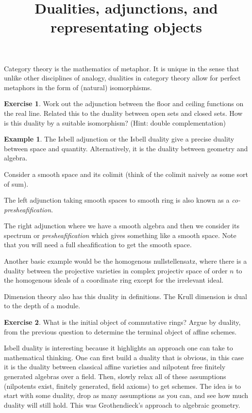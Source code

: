 \documentclass[10pt]{article}
\theoremstyle{plain}%
\theoremstyle{definition}
\newtheorem{example}{Example}[section]
\newtheorem{exercise}{Exercise}[section]
\theoremstyle{remark}
\begin{document}
\title{Dualities, adjunctions, and representating objects}

\maketitle

Category theory is the mathematics of metaphor. It is unique in the sense that unlike other disciplines of analogy, dualities in category theory allow for perfect metaphors in the form of (natural) isomorphisms.

\begin{exercise}
	Work out the adjunction between the floor and ceiling functions on the real line. Related this to the duality between open sets and closed sets. How is this duality by a suitable isomorphism? (Hint: double complementation)
\end{exercise}

\begin{example}
	The Isbell adjunction or the Isbell duality give a precise duality between space and quantity. Alternatively, it is the duality between geometry and algebra.

	Consider a smooth space and its colimit (think of the colimit naively as some sort of sum). 
	
	The left adjunction taking smooth spaces to smooth ring is also known as a \textit{co-presheafification}. 
	
	The right adjunction where we have a smooth algebra and then we consider its spectrum or \textit{presheafification} which gives something like a smooth space. Note that you will need a full sheafification to get the smooth space.

	Another basic example would be the homogenous nullstellensatz, where there is a duality between the projective varieties in complex projectiv space of order $n$ to the homogenous ideals of a coordinate ring except for the irrelevant ideal.

	Dimension theory also has this duality in definitions. The Krull dimension is dual to the depth of a module.
\end{example}

\begin{exercise}
	What is the initial object of commutative rings?
	Argue by duality, from the previous question to determine the terminal object of affine schemes.
\end{exercise}

Isbell duality is interesting because it highlights an approach one can take to mathematical thinking. One can first build a duality that is obvious, in this case it is the duality between classical affine varieties and nilpotent free finitely generated algebras over a field. Then, slowly relax all of these assumptions (nilpotents exist, finitely generated, field axioms) to get schemes. The idea is to start with some duality, drop as many assumptions as you can, and see how much duality will still hold. This was Grothendieck's approach to algebraic geometry.
\end{document}
